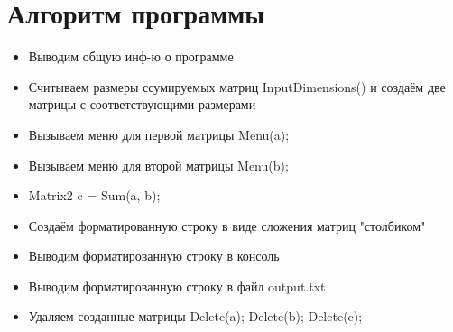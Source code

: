 \section*{Алгоритм программы}

\begin{itemize}
	\item Выводим общую инф-ю о программе
	\item Считываем размеры ссумируемых матриц InputDimensions() и создаём две матрицы
	с соответствующими размерами
	\item Вызываем меню для первой матрицы Menu(a);
	\item Вызываем меню для второй матрицы Menu(b);
	\item Matrix2 c = Sum(a, b);
	\item Создаём форматированную строку в виде сложения матриц "столбиком"
	\item Выводим форматированную строку в консоль
	\item Выводим форматированную строку в файл output.txt
	\item Удаляем созданные матрицы Delete(a); Delete(b); Delete(c);
\end{itemize}